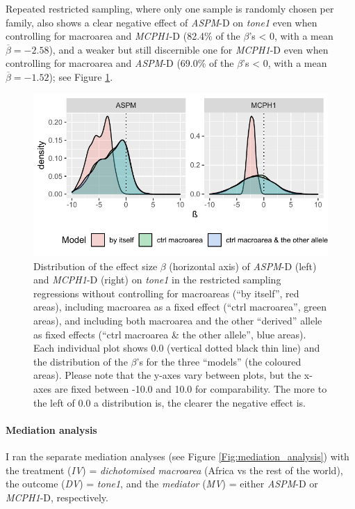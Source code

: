 \documentclass[twoside,twocolumn]{article}
\begin{document}
Repeated restricted sampling, where only one sample is randomly chosen per family, also shows a clear negative effect of \textit{ASPM}-D on \textit{tone1} even when controlling for macroarea and \textit{MCPH1}-D (82.4\% of the $\beta$'s < 0, with a mean $\overline{\beta} = -2.58$), and a weaker but still discernible one for \textit{MCPH1}-D even when controlling for macroarea and \textit{ASPM}-D (69.0\% of the $\beta$'s < 0, with a mean $\overline{\beta} = -1.52$); see Figure \ref{Fig:tone1_regressions_restricted}.

\begin{figure}[h]
  \centering
  \includegraphics[width=\linewidth]{../../code/figures/tone1_regressions_restricted}
  \caption{Distribution of the effect size $\beta$ (horizontal axis) of \textit{ASPM}-D (left) and \textit{MCPH1}-D (right) on \textit{tone1} in the restricted sampling regressions without controlling for macroareas (``by itself'', red areas), including macroarea as a fixed effect (``ctrl macroarea'', green areas), and including both macroarea and the other ``derived'' allele as fixed effects (``ctrl macroarea \& the other allele'', blue areas). Each individual plot shows 0.0 (vertical dotted black thin line) and the distribution of the $\beta$'s for the three ``models'' (the coloured areas). Please note that the y-axes vary between plots, but the x-axes are fixed between -10.0 and 10.0 for comparability. The more to the left of 0.0 a distribution is, the clearer the negative effect is.}
  \label{Fig:tone1_regressions_restricted}
\end{figure}


\paragraph{Mediation analysis}

I ran the separate mediation analyses (see Figure \ref{Fig:mediation_analysis}) with the treatment (\textit{IV}) = \textit{dichotomised macroarea} (Africa vs the rest of the world), the outcome (\textit{DV}) = \textit{tone1}, and the \textit{mediator} (\textit{MV}) = either \textit{ASPM}-D or \textit{MCPH1}-D, respectively.
\end{document}
